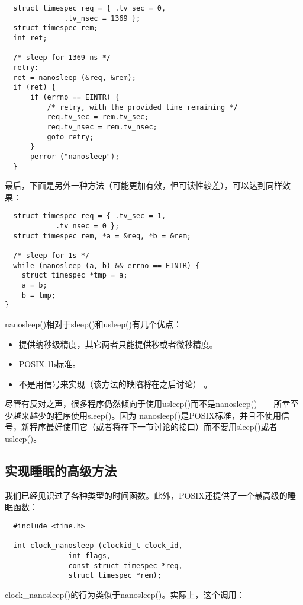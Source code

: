 \begin{lstlisting}
  struct timespec req = { .tv_sec = 0,
			  .tv_nsec = 1369 };
  struct timespec rem;
  int ret;
 
  /* sleep for 1369 ns */
  retry:
  ret = nanosleep (&req, &rem);
  if (ret) {
      if (errno == EINTR) {
          /* retry, with the provided time remaining */
          req.tv_sec = rem.tv_sec;
          req.tv_nsec = rem.tv_nsec;
          goto retry;
      }
      perror ("nanosleep");
  }
\end{lstlisting}

最后，下面是另外一种方法（可能更加有效，但可读性较差），可以达到同样效果： 

\begin{lstlisting}
  struct timespec req = { .tv_sec = 1,
			.tv_nsec = 0 };
  struct timespec rem, *a = &req, *b = &rem;

  /* sleep for 1s */
  while (nanosleep (a, b) && errno == EINTR) {
 	struct timespec *tmp = a;
 	a = b;
	b = tmp;
}
\end{lstlisting}

nanosleep()相对于sleep()和usleep()有几个优点： 

\begin{itemize}
\item 提供纳秒级精度，其它两者只能提供秒或者微秒精度。 
\item POSIX.1b标准。 
\item 不是用信号来实现（该方法的缺陷将在之后讨论） 。
\end{itemize}

尽管有反对之声，很多程序仍然倾向于使用usleep()而不是nanosleep()——所幸至少越来越少的程序使用sleep()。因为 nanosleep()是POSIX标准，并且不使用信号，新程序最好使用它（或者将在下一节讨论的接口）而不要用sleep()或者usleep()。 

\subsection{实现睡眠的高级方法}

我们已经见识过了各种类型的时间函数。此外，POSIX还提供了一个最高级的睡眠函数： 

\begin{lstlisting}
  #include <time.h>

  int clock_nanosleep (clockid_t clock_id,
		       int flags,
		       const struct timespec *req,
		       struct timespec *rem);
\end{lstlisting}

clock\_nanosleep()的行为类似于nanosleep()。实际上，这个调用： 

